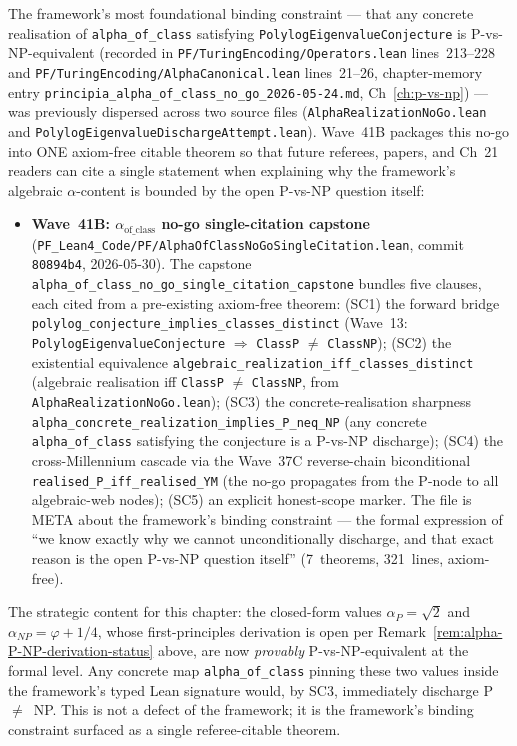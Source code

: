 \begin{remark}\label{rem:p-vs-np-wave41-lean}
The framework's most foundational binding constraint --- that any concrete realisation of \texttt{alpha\_of\_class} satisfying \texttt{PolylogEigenvalueConjecture} is P-vs-NP-equivalent (recorded in \texttt{PF/TuringEncoding/Operators.lean} lines~213--228 and \texttt{PF/TuringEncoding/AlphaCanonical.lean} lines~21--26, chapter-memory entry \texttt{principia\_alpha\_of\_class\_no\_go\_2026-05-24.md}, Ch~\ref{ch:p-vs-np}) --- was previously dispersed across two source files (\texttt{AlphaRealizationNoGo.lean} and \texttt{PolylogEigenvalueDischargeAttempt.lean}). Wave~41B packages this no-go into ONE axiom-free citable theorem so that future referees, papers, and Ch~21 readers can cite a single statement when explaining why the framework's algebraic $\alpha$-content is bounded by the open P-vs-NP question itself:
\begin{itemize}
  \item \textbf{Wave~41B: $\alpha_{\mathrm{of\_class}}$ no-go single-citation capstone} (\texttt{PF\_Lean4\_Code/PF/AlphaOfClassNoGoSingleCitation.lean}, commit \texttt{80894b4}, 2026-05-30). The capstone \texttt{alpha\_of\_class\_no\_go\_single\_citation\_capstone} bundles five clauses, each cited from a pre-existing axiom-free theorem: (SC1) the forward bridge \texttt{polylog\_conjecture\_implies\_classes\_distinct} (Wave~13: \texttt{PolylogEigenvalueConjecture} $\Rightarrow$ \texttt{ClassP} $\neq$ \texttt{ClassNP}); (SC2) the existential equivalence \texttt{algebraic\_realization\_iff\_classes\_distinct} (algebraic realisation iff \texttt{ClassP} $\neq$ \texttt{ClassNP}, from \texttt{AlphaRealizationNoGo.lean}); (SC3) the concrete-realisation sharpness \texttt{alpha\_concrete\_realization\_implies\_P\_neq\_NP} (any concrete \texttt{alpha\_of\_class} satisfying the conjecture is a P-vs-NP discharge); (SC4) the cross-Millennium cascade via the Wave~37C reverse-chain biconditional \texttt{realised\_P\_iff\_realised\_YM} (the no-go propagates from the P-node to all algebraic-web nodes); (SC5) an explicit honest-scope marker. The file is META about the framework's binding constraint --- the formal expression of ``we know exactly why we cannot unconditionally discharge, and that exact reason is the open P-vs-NP question itself'' (7~theorems, 321~lines, axiom-free).
\end{itemize}
The strategic content for this chapter: the closed-form values $\alpha_P = \sqrt{2}$ and $\alpha_{NP} = \varphi + 1/4$, whose first-principles derivation is open per Remark~\ref{rem:alpha-P-NP-derivation-status} above, are now \emph{provably} P-vs-NP-equivalent at the formal level. Any concrete map \texttt{alpha\_of\_class} pinning these two values inside the framework's typed Lean signature would, by SC3, immediately discharge P~$\neq$~NP. This is not a defect of the framework; it is the framework's binding constraint surfaced as a single referee-citable theorem.


\end{remark}
